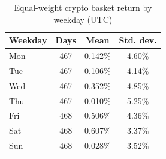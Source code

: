 \begin{table}[H]
\centering
\caption{Equal-weight crypto basket return by weekday (UTC)}
\begin{tabular}{lccc}
\toprule
Weekday & Days & Mean & Std. dev. \\
\midrule
Mon & 467 & 0.142\% & 4.60\% \\
Tue & 467 & 0.106\% & 4.14\% \\
Wed & 467 & 0.352\% & 4.85\% \\
Thu & 467 & 0.010\% & 5.25\% \\
Fri & 468 & 0.506\% & 4.36\% \\
Sat & 468 & 0.607\% & 3.37\% \\
Sun & 468 & 0.028\% & 3.52\% \\
\bottomrule
\end{tabular}
\end{table}
